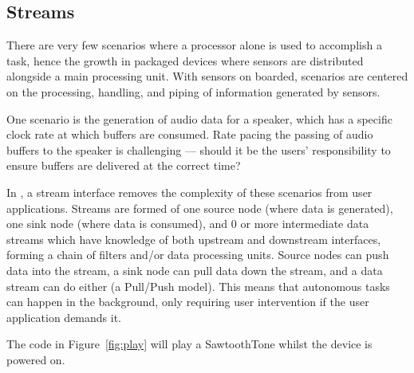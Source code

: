 \subsection{Streams}
There are very few scenarios where a processor alone is used to accomplish a task, hence the growth in packaged devices where sensors are distributed alongside a main processing unit. With sensors on boarded, scenarios are centered on the processing, handling, and piping of information generated by sensors.

One scenario is the generation of audio data for a speaker, which has a specific clock rate at which buffers are consumed. Rate pacing the passing of audio buffers to the speaker is challenging --- should it be the users' responsibility to ensure buffers are delivered at the correct time?

In \CON, a stream interface removes the complexity of these scenarios from user applications. Streams are formed of one source node (where data is generated), one sink node (where data is consumed), and 0 or more intermediate data streams which have knowledge of both upstream and downstream interfaces, forming a chain of filters and/or data processing units. Source nodes can push data into the stream, a sink node can pull data down the stream, and a data stream can do either (a Pull/Push model). This means that autonomous tasks can happen in the background, only requiring user intervention if the user application demands it.

The code in Figure~\ref{fig:play} will play a SawtoothTone whilst the device is powered on.
